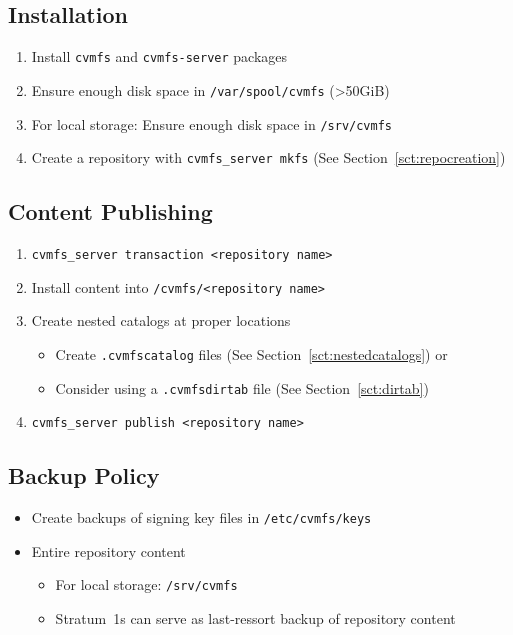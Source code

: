 \subsection{Installation}
\begin{enumerate}
\item Install \texttt{cvmfs} and \texttt{cvmfs-server} packages
\item Ensure enough disk space in \texttt{/var/spool/cvmfs} (\textgreater 50GiB)
\item For local storage: Ensure enough disk space in \texttt{/srv/cvmfs}
\item Create a repository with \texttt{cvmfs\_server mkfs} (See Section~\ref{sct:repocreation})
\end{enumerate}

\subsection{Content Publishing}
\begin{enumerate}
\item \texttt{cvmfs\_server transaction <repository name>}
\item Install content into \texttt{/cvmfs/<repository name>}
\item Create nested catalogs at proper locations
\begin{itemize}
    \item Create \texttt{.cvmfscatalog} files (See Section~\ref{sct:nestedcatalogs}) or
    \item Consider using a \texttt{.cvmfsdirtab} file (See Section~\ref{sct:dirtab})
\end{itemize}
\item \texttt{cvmfs\_server publish <repository name>}
\end{enumerate}

\subsection{Backup Policy}
\begin{itemize}
\item Create backups of signing key files in \texttt{/etc/cvmfs/keys}
\item Entire repository content
\begin{itemize}
   \item For local storage: \texttt{/srv/cvmfs}
   \item Stratum~1s can serve as last-ressort backup of repository content
\end{itemize}
\end{itemize}

